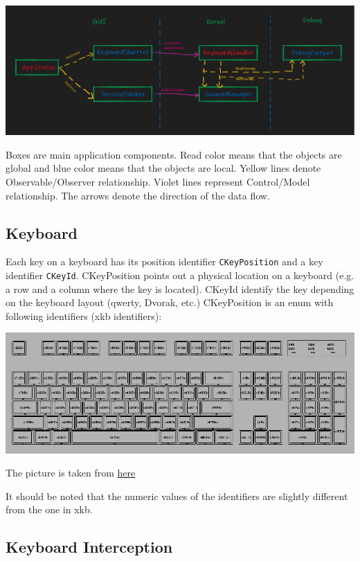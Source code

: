 \documentclass{article}
\begin{document}
\begin{center}
\includegraphics[scale = 0.4]{Figures/Modules.png}
\end{center}

Boxes are main application components. Read color means that the objects are global and blue color means that the objects are local. Yellow lines denote Observable/Observer relationship. Violet lines represent Control/Model relationship. The arrows denote the direction of the data flow.


\subsection{Keyboard}

Each key on a keyboard has its position identifier \verb"CKeyPosition" and a key identifier \verb"CKeyId". CKeyPosition points out a physical location on a keyboard (e.g. a row and a column where the key is located). CKeyId identify the key depending on the keyboard layout (qwerty, Dvorak, etc.) CKeyPosition is an enum with following identifiers (xkb identifiers):
\begin{center}
\includegraphics[scale = 1]{Figures/KeyPosition.png}

The picture is taken from \href{https://www.charvolant.org/doug/xkb/html/node5.html}{here}
\end{center}
It should be noted that the numeric values of the identifiers are slightly different from the one in xkb.

\subsection{Keyboard Interception}
\end{document}
